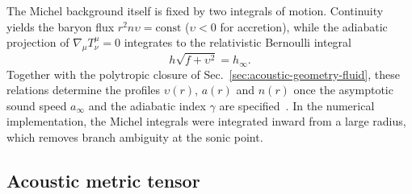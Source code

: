 \documentclass[12pt,a4paper,preprint]{elsarticle}
\begin{document}
            The Michel background itself is fixed by two integrals of motion. Continuity yields the baryon flux $r^{2} n \upsilon = \mathrm{const}$ ($\upsilon<0$ for accretion), while the adiabatic projection of $\nabla_{\mu}T^{\mu}_{\nu}=0$ integrates to the relativistic Bernoulli integral
            \begin{equation}
                h\sqrt{f+\upsilon^{2}} = h_{\infty} .
                \label{eq:michel-bernoulli}
            \end{equation}
            Together with the polytropic closure of Sec.~\ref{sec:acoustic-geometry-fluid}, these relations determine the profiles $\upsilon(r)$, $a(r)$ and $n(r)$ once the asymptotic sound speed $a_{\infty}$ and the adiabatic index $\gamma$ are specified~\cite{MichelFC_AccretionOfMatterByCondensedObjects_1972, ShapiroSL_TeukolskySA_BlackHolesWhiteDwarfsAndNeutronStarsThePhysicsOfCompactObjects_2004}. In the numerical implementation, the Michel integrals were integrated inward from a large radius, which removes branch ambiguity at the sonic point.

        \subsection{Acoustic metric tensor}\label{subsec:acoustic-metric-tensor}
\end{document}
